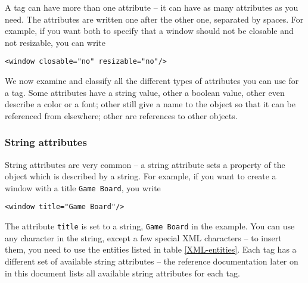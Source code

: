A tag can have more than one attribute -- it can have as many
attributes as you need.  The attributes are written one after the
other one, separated by spaces.  For example, if you want both to specify
that a window should not be closable and not resizable, you can write
\begin{verbatim}
<window closable="no" resizable="no"/>
\end{verbatim}

We now examine and classify all the different types of attributes you
can use for a tag.  Some attributes have a string value, other a
boolean value, other even describe a color or a font; other still give
a name to the object so that it can be referenced from elsewhere;
other are references to other objects.

\subsubsection{String attributes}
String attributes are very common -- a string attribute sets a
property of the object which is described by a string.  For example,
if you want to create a window with a title \texttt{Game Board}, you
write
\begin{verbatim}
<window title="Game Board"/>
\end{verbatim}
The attribute \texttt{title} is set to a string, \texttt{Game Board}
in the example.  You can use any character in the string, except a few
special XML characters -- to insert them, you need to use the entities
listed in table \ref{XML-entities}.  Each tag has a different set of
available string attributes -- the reference documentation later on in
this document lists all available string attributes for each tag.

